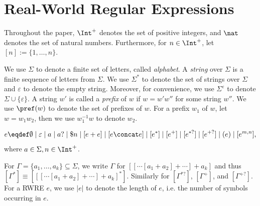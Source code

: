 
\section{Real-World Regular Expressions}\label{sec-rwre}


Throughout the paper, $\Int^+$ denotes the set of positive integers, and  $\nat$ denotes the set of natural numbers. Furthermore, for $n\in \Int^+$, let $[n]:=\{1, \ldots, n\}$. 

We use $\Sigma$ to denote a finite set of letters, called \emph{alphabet}. A \emph{string} over $\Sigma$ is a finite sequence of letters from $\Sigma$. We use $\Sigma^*$ to denote the set of strings over $\Sigma$ and $\varepsilon$ to denote the empty string. Moreover, for convenience, we use $\Sigma^\varepsilon$ to denote $\Sigma \cup \{\varepsilon\}$. A string $w'$ is called a \emph{prefix} of $w$ if $w = w'w''$ for some string $w''$. We use $\pref(w)$ to denote the set of prefixes of $w$. For a prefix $w_1$ of $w$, let $w = w_1 w_2$, then we use $w_1^{-1}w$ to denote $w_2$.


  
\begin{definition}
  	\[e \eqdef \emptyset \mid \varepsilon \mid a \mid a? \mid \$n \mid [e + e] \mid [e \concat e] \mid [e^*] \mid [e^+] \mid [e^{*?}] \mid  [e^{+?}] \mid (e) \mid [e^{m,n}], \]
  	where $a \in \Sigma, n \in \Int^+$. 
\end{definition}
%
For $\Gamma = \{a_1, \ldots, a_k\}\subseteq \Sigma$, we write $\Gamma$ for  $[[\cdots [a_1 + a_2] + \cdots] + a_k]$ and thus $[\Gamma^\ast] \equiv [[[\cdots [a_1 + a_2] + \cdots] + a_k]^\ast]$. Similarly for $[\Gamma^{\ast?}]$, $[\Gamma^+]$, and $[\Gamma^{+?}]$. For a RWRE $e$, we use $|e|$ to denote the length of $e$, i.e. the number of symbols occurring in $e$.

